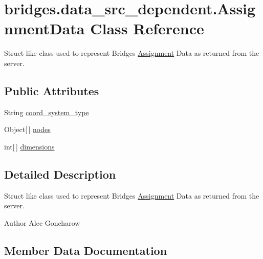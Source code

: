 \hypertarget{classbridges_1_1data__src__dependent_1_1_assignment_data}{}\section{bridges.\+data\+\_\+src\+\_\+dependent.\+Assignment\+Data Class Reference}
\label{classbridges_1_1data__src__dependent_1_1_assignment_data}


Struct like class used to represent Bridges \hyperlink{classbridges_1_1data__src__dependent_1_1_assignment}{Assignment} Data as returned from the server.  


\subsection*{Public Attributes}
\begin{DoxyCompactItemize}
\item 
String \hyperlink{classbridges_1_1data__src__dependent_1_1_assignment_data_a6734aba0f017aca0024fcd80905be4f4}{coord\+\_\+system\+\_\+type}
\item 
Object\mbox{[}$\,$\mbox{]} \hyperlink{classbridges_1_1data__src__dependent_1_1_assignment_data_a1d7c23816a57cf9b3bd1bc0b53f15e8e}{nodes}
\item 
int\mbox{[}$\,$\mbox{]} \hyperlink{classbridges_1_1data__src__dependent_1_1_assignment_data_ab4aa179a24395748542f6fb64307132c}{dimensions}
\end{DoxyCompactItemize}


\subsection{Detailed Description}
Struct like class used to represent Bridges \hyperlink{classbridges_1_1data__src__dependent_1_1_assignment}{Assignment} Data as returned from the server. 

\begin{DoxyAuthor}{Author}
Alec Goncharow 
\end{DoxyAuthor}


\subsection{Member Data Documentation}
\hypertarget{classbridges_1_1data__src__dependent_1_1_assignment_data_a6734aba0f017aca0024fcd80905be4f4}{}
